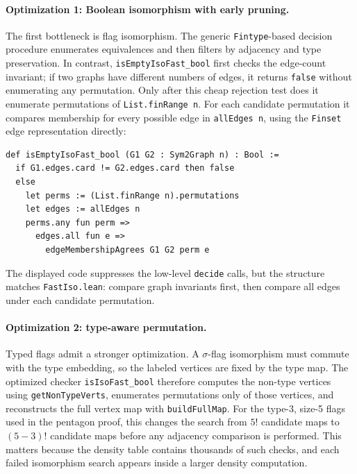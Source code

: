 \documentclass{article}
\newcommand{\lean}[1]{\texttt{#1}}
\begin{document}
\paragraph{Optimization 1: Boolean isomorphism with early pruning.}
The first bottleneck is flag isomorphism.  The generic \lean{Fintype}-based
decision procedure enumerates equivalences and then filters by adjacency and
type preservation.  In contrast, \lean{isEmptyIsoFast\_bool} first checks the
edge-count invariant; if two graphs have different numbers of edges, it returns
\lean{false} without enumerating any permutation.  Only after this cheap
rejection test does it enumerate permutations of \lean{List.finRange n}.  For
each candidate permutation it compares membership for every possible edge in
\lean{allEdges n}, using the \lean{Finset} edge representation directly:
\begin{lstlisting}
def isEmptyIsoFast_bool (G1 G2 : Sym2Graph n) : Bool :=
  if G1.edges.card != G2.edges.card then false
  else
    let perms := (List.finRange n).permutations
    let edges := allEdges n
    perms.any fun perm =>
      edges.all fun e =>
        edgeMembershipAgrees G1 G2 perm e
\end{lstlisting}
The displayed code suppresses the low-level \lean{decide} calls, but the
structure matches \lean{FastIso.lean}: compare graph invariants first, then
compare all edges under each candidate permutation.

\paragraph{Optimization 2: type-aware permutation.}
Typed flags admit a stronger optimization.  A $\sigma$-flag isomorphism must
commute with the type embedding, so the labeled vertices are fixed by the type
map.  The optimized checker \lean{isIsoFast\_bool} therefore computes the
non-type vertices using \lean{getNonTypeVerts}, enumerates permutations only of
those vertices, and reconstructs the full vertex map with \lean{buildFullMap}.
For the type-3, size-5 flags used in the pentagon proof, this changes the
search from $5!$ candidate maps to $(5-3)!$ candidate maps before any adjacency
comparison is performed.  This matters because the density table contains
thousands of such checks, and each failed isomorphism search appears inside a
larger density computation.
\end{document}
